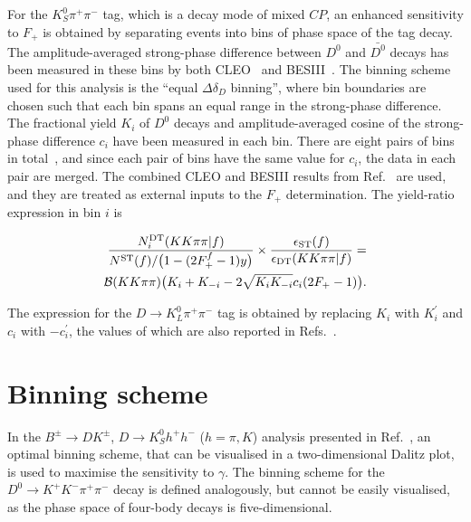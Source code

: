 \documentclass[12pt, a4paper, notitlepage, onecolumn]{article}
\begin{document}
For the $K_S^0\pi^+\pi^-$ tag, which is a decay mode of  mixed $C\!P$, an enhanced sensitivity to $F_+$ is obtained by separating events into bins of phase space of the tag decay. The amplitude-averaged strong-phase difference between $D^0$ and $\bar{D^0}$ decays has been measured in these bins by both CLEO~\cite{cite:CLEOcisiKSpipi} and BESIII~\cite{cite:KSpipiStrongPhase}. The binning scheme used for this analysis is the ``equal $\Delta\delta_D$ binning'', where bin boundaries are chosen such that each bin spans an equal range in the strong-phase difference. The fractional yield $K_i$ of $D^0$ decays and amplitude-averaged cosine of the strong-phase difference $c_i$ have been measured in each bin. There are eight pairs of bins in total~\cite{cite:CLEOcisiKSpipi}, and since each pair of bins have the same value for $c_i$, the data in each pair are merged. The combined CLEO and BESIII results from Ref.~\cite{cite:KSpipiStrongPhase} are used, and they are treated as external inputs to the $F_+$ determination. The yield-ratio expression in bin $i$ is
\begin{linenomath}
    \begin{align}
        \frac{N_i^{\rm DT}(KK\pi\pi | f)}{N^{\rm ST}(f)/\big(1 - (2F_+^{f} - 1)y\big)}\times\frac{\epsilon_{\rm ST}(f)}{\epsilon_{\rm DT}(KK\pi\pi | f)} = \nonumber \\
        \mathcal{B}(KK\pi\pi)\big(K_i + K_{-i} - 2\sqrt{K_iK_{-i}}c_i(2F_+ - 1)\big).
        \label{equation:DT_ST_yield_ratio_binned}
    \end{align}
\end{linenomath}
The expression for the $D\to K_L^0\pi^+\pi^-$ tag is obtained by replacing $K_i$ with $K_i^\prime$ and $c_i$ with $-c_i^\prime$, the values of which are also reported in Refs.~\cite{cite:CLEOcisiKSpipi,cite:KSpipiStrongPhase}.

\section{Binning scheme}
\label{section_binning_scheme}
In the $B^\pm\to DK^\pm$, $D\to K^0_S h^+h^-$ ($h=\pi, K$) analysis presented in Ref.~\cite{LHCb-PAPER-2020-019}, an optimal binning scheme, that can be visualised in a two-dimensional Dalitz plot, is used to maximise the sensitivity to $\gamma$. The binning scheme for the $D^0\to K^+K^-\pi^+\pi^-$ decay is defined analogously, but cannot be easily visualised, as the phase space of four-body decays is five-dimensional.
\end{document}
